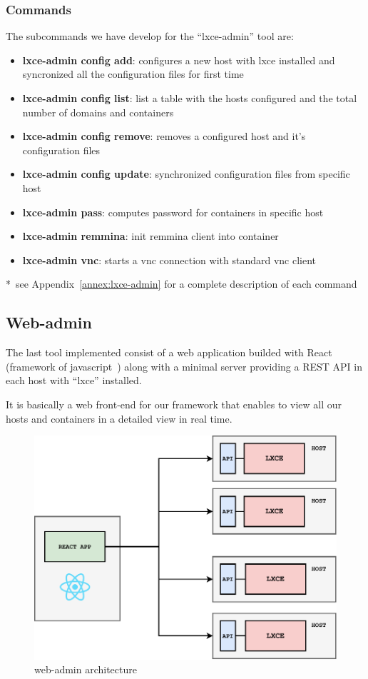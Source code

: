 \subsubsection{Commands}
The subcommands we have develop for the ``lxce-admin'' tool are:
\begin{itemize}
	\item{\textbf{lxce-admin config add}: configures a new host with lxce installed and syncronized all the configuration files for first time}
	\item{\textbf{lxce-admin config list}: list a table with the hosts configured and the total number of domains and containers}
	\item{\textbf{lxce-admin config remove}: removes a configured host and it's configuration files}
	\item{\textbf{lxce-admin config update}: synchronized configuration files from specific host}
	\item{\textbf{lxce-admin pass}: computes password for containers in specific host}
	\item{\textbf{lxce-admin remmina}: init remmina client into container}
	\item{\textbf{lxce-admin vnc}: starts a vnc connection with standard vnc client}
\end{itemize}
*~see Appendix~\ref{annex:lxce-admin} for a complete description of each command

\newpage
\subsection{Web-admin}
The last tool implemented consist of a web application builded with React (framework of javascript~\cite{react}) along with a minimal server providing a REST API in each host with ``lxce'' installed.

It is basically a web front-end for our framework that enables to view all our hosts and containers in a detailed view in real time.

\begin{figure}[H]
	\label{fig:Web admin architecture}
	\centering
	\includegraphics{img/03/web-admin-diagram.pdf}
	\caption[Web-admin architecture]{\footnotesize{web-admin architecture}}
\end{figure}

